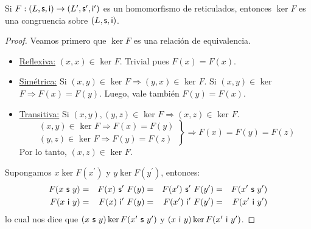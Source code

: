   \begin{lemma}
    \PN Si $F: (L, \mathsf{s}, \mathsf{i}) \rightarrow (L^{\prime}, \mathsf{s}^{\prime}, \mathsf{i}^{\prime})$ es un homomorfismo de reticulados,
    entonces $\ker F$ es una congruencia sobre $(L, \mathsf{s}, \mathsf{i})$.
  \end{lemma}
  \begin{proof}
    \PN Veamos primero que $\ker F$ es una relación de equivalencia.
    \begin{itemize}
      \item \underline{Reflexiva:} $(x, x) \in$ ker $F$. Trivial pues $F(x) = F(x)$.
      \item \underline{Simétrica:} Si $(x, y) \in$ ker $F \Rightarrow (y, x) \in$ ker $F$.
        \PN Si $(x, y) \in$ ker $F \Rightarrow F(x) = F(y)$. Luego, vale también $F(y) = F(x)$.
      \item \underline{Transitiva:} Si $(x, y), (y, z) \in$ ker $F \Rightarrow (x, z) \in$ ker $F$.
        \begin{equation*}
          \left.
          \begin{array}{l}
            (x, y) \in \text{ ker } F \Rightarrow F(x) = F(y) \\
            (y, z) \in \text{ ker } F \Rightarrow F(y) = F(z)
          \end{array}
          \right \rbrace \Rightarrow F(x) = F(y) = F(z)
        \end{equation*}
        \PN Por lo tanto, $(x, z) \in$ ker $F$.
      \end{itemize}

    \PN Supongamos $x \ker F(x^{\prime})$ y $y \ker F(y^{\prime})$, entonces:
    \begin{alignat*}{4}
      F(x \ \mathsf{s} \ y) &=& F(x) \ \mathsf{s^{\prime}} \ F(y) &=& F(x^{\prime}) \ \mathsf{s^{\prime}} \ F(y^{\prime}) &=&
        F(x^{\prime} \ \mathsf{s} \ y^{\prime}) \\
      F(x \ \mathsf{i} \ y) &=& F(x) \ \mathsf{i^{\prime}} \ F(y) &=& F(x^{\prime}) \ \mathsf{i^{\prime}} \ F(y^{\prime}) &=&
        F(x^{\prime} \ \mathsf{i} \ y^{\prime}) \\
    \end{alignat*}
    \PN lo cual nos dice que $(x \ \SU \ y) \ker F(x^{\prime} \ \SU \ y^{\prime})$ y $(x \ \mathsf{i} \ y) \ker F(x^{\prime} \
    \mathsf{i} \ y^{\prime})$.
  \end{proof}

